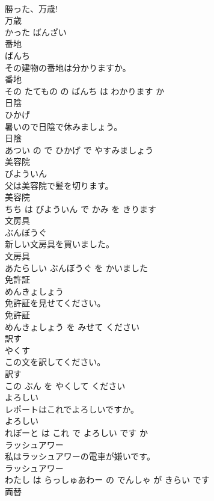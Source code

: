 \documentclass[8pt]{extreport}
\begin{document}
\begin{CJK}{UTF8}{min}
\\	勝った、万歳!	
\\	万歳 
\\	かった ばんざい			
\\	番地	
\\	ばんち			
\\	その建物の番地は分かりますか。	
\\	番地 
\\	その たてもの の ばんち は わかります か			
\\	日陰	
\\	ひかげ			
\\	暑いので日陰で休みましょう。	
\\	日陰 
\\	あつい の で ひかげ で やすみましょう			
\\	美容院	
\\	びよういん			
\\	父は美容院で髪を切ります。	
\\	美容院 
\\	ちち は びよういん で かみ を きります			
\\	文房具	
\\	ぶんぼうぐ			
\\	新しい文房具を買いました。	
\\	文房具 
\\	あたらしい ぶんぼうぐ を かいました			
\\	免許証	
\\	めんきょしょう			
\\	免許証を見せてください。	
\\	免許証 
\\	めんきょしょう を みせて ください			
\\	訳す	
\\	やくす			
\\	この文を訳してください。	
\\	訳す 
\\	この ぶん を やくして ください			
\\	よろしい	
\\	レポートはこれでよろしいですか。	
\\	よろしい 
\\	れぽーと は これ で よろしい です か			
\\	ラッシュアワー	
\\	私はラッシュアワーの電車が嫌いです。	
\\	ラッシュアワー 
\\	わたし は らっしゅあわー の でんしゃ が きらい です			
\\	両替	

\end{CJK}
\end{document}
